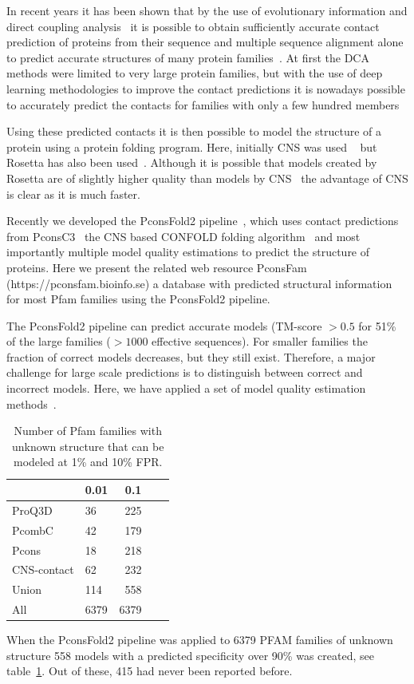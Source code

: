 \documentclass[a4,center,fleqn]{NAR}
\begin{document}
In recent years it has been shown that by the use of evolutionary
information and direct coupling analysis~\cite{Weigt19116270} it is
possible to obtain sufficiently accurate contact prediction of
proteins from their sequence and multiple sequence alignment alone to
predict accurate structures of many protein
families~\cite{Sulkowska2012}. At first the DCA methods were limited
to very large protein families, but with the use of deep learning
methodologies to improve the contact predictions it is nowadays
possible to accurately predict the contacts for families with only a
few hundred members~\cite{Skwark25375897,Michel28535189,Wang28056090}

Using these predicted contacts it is then possible to model the
structure of a protein using a protein folding program. Here,
initially CNS was used ~\cite{Morcos22106262} but Rosetta has also
been used~\cite{Baker:1999}. Although it is possible that models
created by Rosetta are of slightly higher quality than models by
CNS~\cite{Michel25161237} the advantage of CNS is clear as it is much
faster. 


Recently we developed the PconsFold2 pipeline~\cite{Michel28881974}, which uses contact
predictions from PconsC3~\cite{Michel28535189} the CNS based CONFOLD folding
algorithm~\cite{Adhikari25974172} and most importantly multiple model quality estimations
\cite{Uziela28052925,Lundstrom:2001} to predict the structure of
proteins. Here we present the related web resource PconsFam
(https://pconsfam.bioinfo.se) a database with predicted structural
information for most Pfam families using the PconsFold2
pipeline.

The PconsFold2 pipeline can predict accurate models (TM-score $>0.5$
for 51\% of the large families ($>1000$ effective sequences). For
smaller families the fraction of correct models decreases, but they
still exist. Therefore, a major challenge for large scale predictions
is to distinguish between correct and incorrect models. Here, we have
applied a set of model quality estimation methods~\cite{Kryshtafovych28833563}.

\begin{table}[tb!]
\centering
\caption{Number of Pfam families with unknown structure that can be modeled at
1\% and 10\% FPR.}
\label{tab:nopdb1}
    \begin{tabular}{p{}p{}rp{}r}
  \hline
 & 0.01 & 0.1 \\ 
  \hline
  ProQ3D & 36 & 225 \\ 
  PcombC & 42 & 179 \\ 
  Pcons & 18 & 218 \\ 
  CNS-contact & 62 & 232 \\  \hline 
  Union & 114 & 558 \\ 
  All & 6379 &  6379 \\ 
   \hline
\end{tabular}
\end{table}
When the PconsFold2 pipeline was applied to 6379 PFAM families of
unknown structure 558 models with a predicted specificity over 90\% was
created, see table~\ref{tab:nopdb1}. Out of these, 415 had never been reported before.
\end{document}

